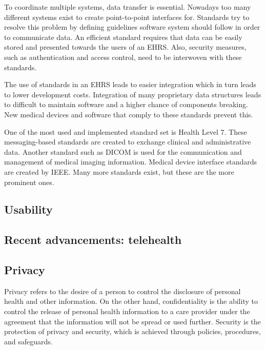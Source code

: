         To coordinate multiple systems, data transfer is essential. Nowadays too many different systems exist to create point-to-point interfaces for. Standards try to resolve this problem by defining guidelines software system should follow in order to communicate data. An efficient standard requires that data can be easily stored and presented towards the users of an EHRS\@. Also, security measures, such as authentication and access control, need to be interwoven with these standards.

        The use of standards in an EHRS leads to easier integration which in turn leads to lower development costs. Integration of many proprietary data structures leads to difficult to maintain software and a higher chance of components breaking. New medical devices and software that comply to these standards prevent this.

        One of the most used and implemented standard set is Health Level 7. These messaging-based standards are created to exchange clinical and administrative data. Another standard such as DICOM is used for the communication and management of medical imaging information\cite{mildenberger2002introduction}. Medical device interface standards are created by IEEE\@. Many more standards exist, but these are the more prominent ones.

    \subsection{Usability}\label{bg_usability}

    \subsection{Recent advancements: telehealth}

    \subsection{Privacy}\label{bg_privacy}

    Privacy refers to the desire of a person to control the disclosure of personal health and other information\cite{Shortliffe2014}. On the other hand, confidentiality is the ability to control the release of personal health information to a care provider under the agreement that the information will not be spread or used further. Security is the protection of privacy and security, which is achieved through policies, procedures, and safeguards. 

